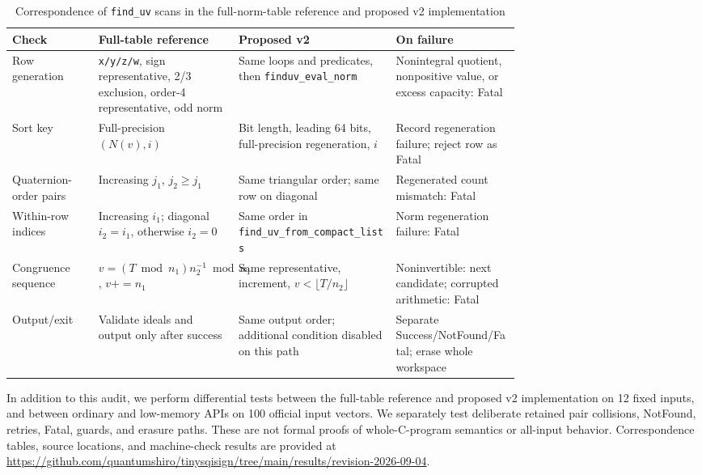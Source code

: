 \documentclass[a4paper,10pt]{article}
\theoremstyle{definition}
\theoremstyle{remark}
\begin{document}
\begin{table}[H]
  \centering
  \caption{Correspondence of \texttt{find\_uv} scans in the full-norm-table reference and proposed v2 implementation}
  \label{tab:finduv-correspondence}
  \scriptsize
  \begin{tabularx}{\linewidth}{@{}p{0.17\linewidth}p{0.25\linewidth}p{0.31\linewidth}X@{}}
    \toprule
    Check & Full-table reference & Proposed v2 & On failure \\
    \midrule
    Row generation & \texttt{x/y/z/w}, sign representative, 2/3 exclusion, order-4 representative, odd norm & Same loops and predicates, then \texttt{finduv\_eval\_norm} & Nonintegral quotient, nonpositive value, or excess capacity: Fatal \\
    Sort key & Full-precision $(N(v),i)$ & Bit length, leading 64 bits, full-precision regeneration, $i$ & Record regeneration failure; reject row as Fatal \\
    Quaternion-order pairs & Increasing $j_1$, $j_2\geq j_1$ & Same triangular order; same row on diagonal & Regenerated count mismatch: Fatal \\
    Within-row indices & Increasing $i_1$; diagonal $i_2=i_1$, otherwise $i_2=0$ & Same order in \texttt{find\_uv\_from\_compact\_lists} & Norm regeneration failure: Fatal \\
    Congruence sequence & $v=(T\bmod n_1)n_2^{-1}\bmod n_1$, $v{+}{=}n_1$ & Same representative, increment, $v<\lfloor T/n_2\rfloor$ & Noninvertible: next candidate; corrupted arithmetic: Fatal \\
    Output/exit & Validate ideals and output only after success & Same output order; additional condition disabled on this path & Separate Success/NotFound/Fatal; erase whole workspace \\
    \bottomrule
  \end{tabularx}
\end{table}

In addition to this audit, we perform differential tests between the full-table reference and proposed v2 implementation on 12 fixed inputs, and between ordinary and low-memory APIs on 100 official input vectors. We separately test deliberate retained pair collisions, NotFound, retries, Fatal, guards, and erasure paths. These are not formal proofs of whole-C-program semantics or all-input behavior. Correspondence tables, source locations, and machine-check results are provided at \url{https://github.com/quantumshiro/tinysqisign/tree/main/results/revision-2026-09-04}.
\end{document}
